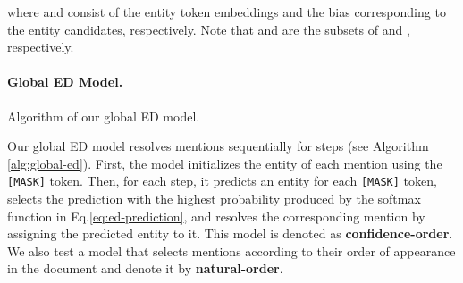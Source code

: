 \documentclass[11pt]{article}
\begin{document}
where  and  consist of the entity token embeddings and the bias corresponding to the entity candidates, respectively.
Note that  and  are the subsets of  and , respectively.

\paragraph{Global ED Model.}
\label{subsec:global-ed}

\SetAlFnt{\small}
\SetAlCapFnt{\small}
\SetAlCapNameFnt{\small}
\begin{algorithm}[t]
  \SetAlgoLined
  \SetArgSty{}
  \DontPrintSemicolon
  \KwInit{\;}
  \Return{\{}
  \caption{Algorithm of our global ED model.}
  \label{alg:global-ed}
\end{algorithm}

Our global ED model resolves mentions sequentially for  steps (see Algorithm \ref{alg:global-ed}).
First, the model initializes the entity of each mention using the \texttt{[MASK]} token.
Then, for each step, it predicts an entity for each \texttt{[MASK]} token, selects the prediction with the highest probability produced by the softmax function in Eq.\eqref{eq:ed-prediction}, and resolves the corresponding mention by assigning the predicted entity to it.
This model is denoted as \textbf{confidence-order}.
We also test a model that selects mentions according to their order of appearance in the document and denote it by \textbf{natural-order}.
\end{document}
